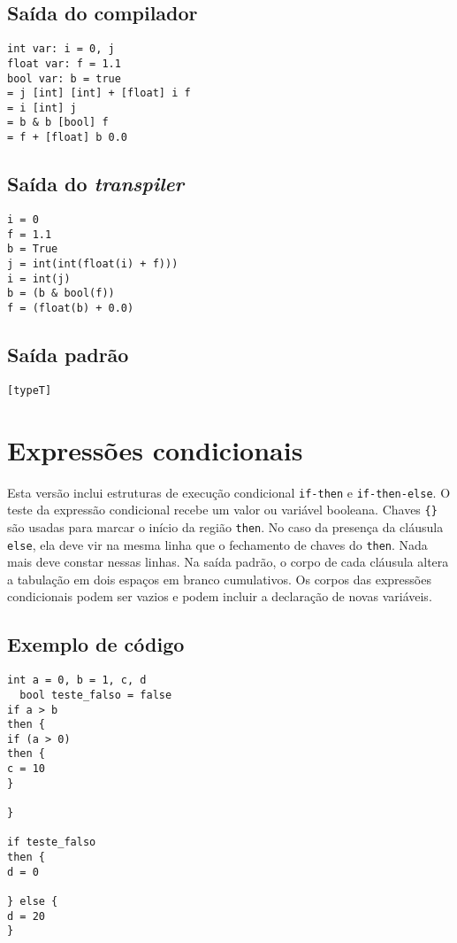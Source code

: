 \documentclass{article}
\begin{document}
\subsection{Saída do compilador}

\begin{verbatim}
int var: i = 0, j
float var: f = 1.1
bool var: b = true
= j [int] [int] + [float] i f
= i [int] j
= b & b [bool] f
= f + [float] b 0.0
\end{verbatim}

\subsection{Saída do \emph{transpiler}}

\begin{verbatim}
i = 0
f = 1.1
b = True
j = int(int(float(i) + f)))
i = int(j)
b = (b & bool(f))
f = (float(b) + 0.0)
\end{verbatim}

\subsection{Saída padrão}

\begin{verbatim}
[typeT]
\end{verbatim}

\section{Expressões condicionais}

Esta versão inclui estruturas de execução condicional \texttt{if-then} e
\texttt{if-then-else}. O teste da expressão condicional recebe um valor ou
variável booleana. Chaves \texttt{\{\}} são usadas para marcar o início da
região \texttt{then}. No caso da presença da cláusula \texttt{else}, ela deve
vir na mesma linha que o fechamento de chaves do \texttt{then}. Nada mais deve
constar nessas linhas. Na saída padrão, o corpo de cada cláusula altera a
tabulação em dois espaços em branco cumulativos. Os corpos das expressões
condicionais podem ser vazios e podem incluir a declaração de novas variáveis.

\subsection{Exemplo de código}

\begin{verbatim}
int a = 0, b = 1, c, d
  bool teste_falso = false
if a > b
then {
if (a > 0)
then {
c = 10
}

}

if teste_falso
then {
d = 0

} else {
d = 20
}
\end{verbatim}
\end{document}

